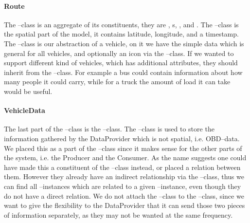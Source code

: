 \paragraph*{Route}
The --class is an aggregate of its constituents, they are , s, , and . 
The --class is the spatial part of the model, it contains latitude, longitude, and a timestamp.
The --class is our abstraction of a vehicle, on it we have the simple data which is general for all vehicles, and optionally an icon via the --class.
If we wanted to support different kind of vehicles, which has additional attributes, they should inherit from the --class.
For example a bus could contain information about how many people it could carry, while for a truck the amount of load it can take would be useful. 

\paragraph*{VehicleData}\label{par:vehicledata}
The last part of the --class is the --class. 
The --class is used to store the information gathered by the DataProvider which is not spatial, i.e. \ac{OBD}--data.
We placed this as a part of the --class since it makes sense for the other parts of the system, i.e. the Producer and the Consumer. 
As the name suggests one could have made this a constituent of the --class instead, or placed a relation between them.
However they already have an indirect relationship via the --class, 
thus we can find all --instances which are related to a given --instance, even though they do not have a direct relation. 
We do not attach the --class to the --class, 
since we want to give the flexibility to the DataProvider that it can send those two pieces of information separately, as they may not be wanted at the same frequency. 

